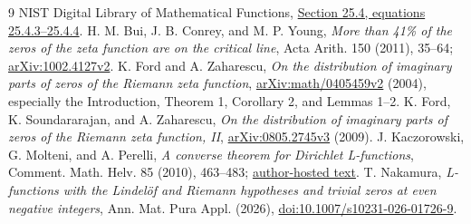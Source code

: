 \documentclass[11pt,a4paper]{article}
\theoremstyle{definition}
\theoremstyle{remark}
\begin{document}
\begin{thebibliography}{9}
NIST Digital Library of Mathematical Functions,
\href{https://dlmf.nist.gov/25.4}{Section 25.4, equations 25.4.3--25.4.4}.
H. M. Bui, J. B. Conrey, and M. P. Young,
\emph{More than 41\% of the zeros of the zeta function are on the critical line},
Acta Arith. 150 (2011), 35--64;
\href{https://arxiv.org/abs/1002.4127}{arXiv:1002.4127v2}.
K. Ford and A. Zaharescu,
\emph{On the distribution of imaginary parts of zeros of the Riemann zeta function},
\href{https://arxiv.org/abs/math/0405459}{arXiv:math/0405459v2} (2004),
especially the Introduction, Theorem 1, Corollary 2, and Lemmas 1--2.
K. Ford, K. Soundararajan, and A. Zaharescu,
\emph{On the distribution of imaginary parts of zeros of the Riemann zeta function, II},
\href{https://arxiv.org/abs/0805.2745}{arXiv:0805.2745v3} (2009).
J. Kaczorowski, G. Molteni, and A. Perelli,
\emph{A converse theorem for Dirichlet L-functions},
Comment. Math. Helv. 85 (2010), 463--483;
\href{https://sites.unimi.it/molteni/research/papers-pdf/23-molteni-A_converse_theorem_for_Dirichlet_L-functions.pdf}{author-hosted text}.
T. Nakamura,
\emph{L-functions with the Lindel\"of and Riemann hypotheses and trivial zeros
at even negative integers}, Ann. Mat. Pura Appl. (2026),
\href{https://doi.org/10.1007/s10231-026-01726-9}{doi:10.1007/s10231-026-01726-9}.
\end{thebibliography}
\end{document}
